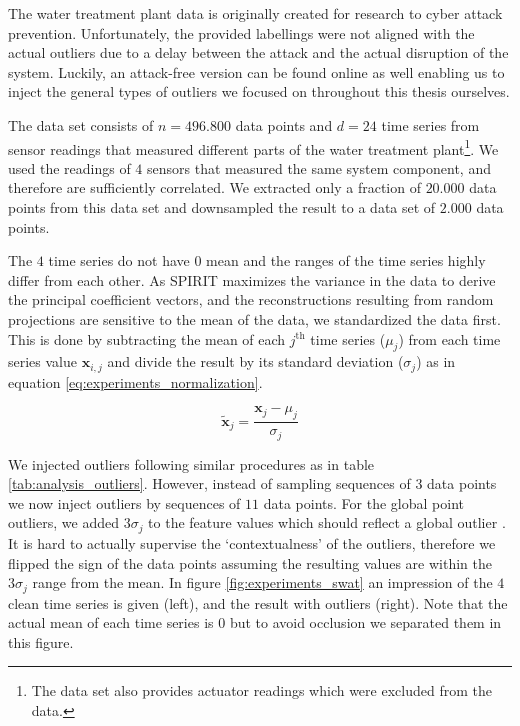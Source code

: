 The water treatment plant data is originally created for research to cyber attack prevention. Unfortunately, the provided labellings were not aligned with the actual outliers due to a delay between the attack and the actual disruption of the system. Luckily, an attack-free version can be found online as well enabling us to inject the general types of outliers we focused on throughout this thesis ourselves. 

The data set consists of $n=496.800$ data points and $d=24$ time series from sensor readings that measured different parts of the water treatment plant\footnote{The data set also provides actuator readings which were excluded from the data.}. We used the readings of $4$ sensors that measured the same system component, and therefore are sufficiently correlated. We extracted only a fraction of $20.000$ data points from this data set and downsampled the result to a data set of $2.000$ data points.  

The $4$ time series do not have $0$ mean and the ranges of the time series highly differ from each other. As SPIRIT maximizes the variance in the data to derive the principal coefficient vectors, and the reconstructions resulting from random projections are sensitive to the mean of the data, we standardized the data first. This is done by subtracting the mean of each $j^{\text{th}}$ time series ($\mu_j$) from each time series value $\mathbf{x}_{i,j}$ and divide the result by its standard deviation ($\sigma_j$) as in equation \eqref{eq:experiments_normalization}.

\begin{equation}\label{eq:experiments_normalization}
	\tilde{\mathbf{x}}_j = \frac{\mathbf{x}_j - \mu_j}{\sigma_j}
\end{equation}

We injected outliers following similar procedures as in table \ref{tab:analysis_outliers}. However, instead of sampling sequences of $3$ data points we now inject outliers by sequences of $11$ data points. For the global point outliers, we added $3\sigma_j$ to the feature values which should reflect a global outlier \cite{zimek2012survey}. It is hard to actually supervise the `contextualness' of the outliers, therefore we flipped the sign of the data points assuming the resulting values are within the $3\sigma_j$ range from the mean. In figure \ref{fig:experiments_swat} an impression of the $4$ clean time series is given (left), and the result with outliers (right). Note that the actual mean of each time series is $0$ but to avoid occlusion we separated them in this figure. 

